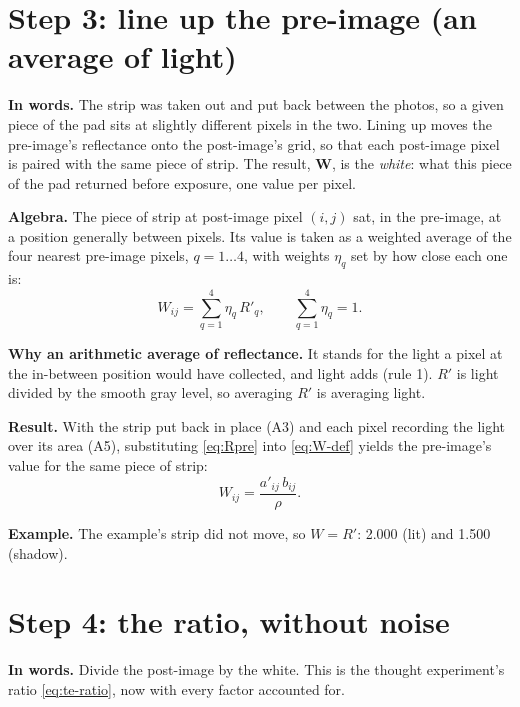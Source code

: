 \documentclass[11pt,letter]{article}
\newcommand{\iW}{\mathbf{W}}   %
\begin{document}
\section{Step 3: line up the pre-image (an average of light)}
\label{sec:lineup}

\textbf{In words.}  The strip was taken out and put back between the
photos, so a given piece of the pad sits at slightly different pixels in
the two.  Lining up moves the pre-image's reflectance onto the
post-image's grid, so that each post-image pixel is paired with the same
piece of strip.  The result, $\iW$, is the \emph{white}: what this piece
of the pad returned before exposure, one value per pixel.

\textbf{Algebra.}  The piece of strip at post-image pixel $(i, j)$ sat,
in the pre-image, at a position generally between pixels.  Its value is
taken as a weighted average of the four nearest pre-image pixels,
$q = 1 \dots 4$, with weights $\eta_q$ set by how close each one is:
\begin{equation}
  W_{ij} = \sum_{q=1}^{4} \eta_q\, R'_q , \qquad
  \sum_{q=1}^{4} \eta_q = 1 .
  \label{eq:W-def}
\end{equation}

\textbf{Why an arithmetic average of reflectance.}  It stands for the
light a pixel at the in-between position would have collected, and light
adds (rule 1).  $R'$ is light divided by the smooth gray level, so
averaging $R'$ is averaging light.

\textbf{Result.}  With the strip put back in place (A3) and each pixel
recording the light over its area (A5), substituting \eqref{eq:Rpre} into
\eqref{eq:W-def} yields the pre-image's value for the same piece of
strip:
\begin{equation}
  W_{ij} = \frac{a'_{ij}\, b_{ij}}{\rho} .
  \label{eq:W}
\end{equation}

\textbf{Example.}  The example's strip did not move, so $W = R'$: 2.000
(lit) and 1.500 (shadow).

\section{Step 4: the ratio, without noise}
\label{sec:ratio}

\textbf{In words.}  Divide the post-image by the white.  This is the
thought experiment's ratio \eqref{eq:te-ratio}, now with every factor
accounted for.
\end{document}
